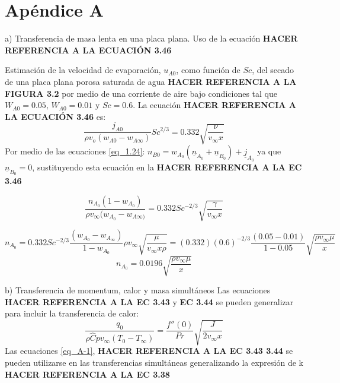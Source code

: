 \newpage
\section* {Apéndice A}
a) Transferencia de masa lenta en una placa plana. Uso de la ecuación \textbf{HACER REFERENCIA A LA ECUACIÓN 3.46}
\newline

Estimación de la velocidad de evaporación, $u_{A0}$, como función de $Sc$, del secado de una placa plana porosa saturada de agua \textbf{HACER REFERENCIA A LA FIGURA 3.2} por medio de una corriente de aire bajo condiciones tal que $W_{A0}=0.05$, $W_{A0}=0.01$ y $Sc=0.6$.
\newline
La ecuación \textbf{HACER REFERENCIA A LA ECUACIÓN 3.46} es:
\begin{equation*}
    \frac{j_{A0}}{\rho v_o(w_{A0}-w_{A\infty})}Sc^{2/3}=0.332\sqrt{\frac{\nu}{v_\infty x}}
\end{equation*}
Por medio de las ecuaciones \eqref{eq_1.24}: $n_{B0}=w_{A_0}(\underline{n}_{A_0}+\underline{n}_{B_0})+\underline{j}_{A_0}$ ya que $\underline{n}_{B_0}=0$, sustituyendo esta ecuación en la \textbf{HACER REFERENCIA A LA EC 3.46}

\begin{equation*}
    \frac{n_{A_0}(1-w_{A_0})}{\rho v_\infty (w_{A_0 }-w_{A\infty)}}=0.332Sc^{-2/3}\sqrt{\frac{\gamma}{v_\infty x}}
\end{equation*}

\begin{equation*}
n_{A_0}=0.332Sc^{-2/3}\frac{(w_{A_0}-w_{A_\infty})}{1-w_{A_0}}\rho v_\infty\sqrt{\frac{\mu}{v_\infty x \rho}}=(0.332)(0.6)^{-2/3}\frac{(0.05-0.01)}{1-0.05}\sqrt{\frac{\rho v_\infty \mu}{x}}
\end{equation*}
\begin{equation*}
    n_{A_0}=0.0196 \sqrt{\frac{\rho v_\infty \mu}{x}}
\end{equation*}
\par
b) Transferencia de momentum, calor y masa simultáneos
\newline
Las ecuaciones \textbf{HACER REFERENCIA A LA EC 3.43} y \textbf{EC 3.44} se pueden generalizar para incluir la transferencia de calor:
\begin{equation}
    \frac{q_0}{\rho \hat{C}pv_\infty(T_0-T_\infty)}=\frac{f''(0)}{Pr}\sqrt{\frac{J}{2v_\infty x}}
    \tag{A-1}
    \label{eq_A-1}
\end{equation}
Las ecuaciones \eqref{eq_A-1}, \textbf{HACER REFERENCIA A LA EC 3.43 3.44} se pueden utilizarse en las transferencias simultáneas generalizando la expresión de k \textbf{HACER REFERENCIA A LA EC 3.38}

